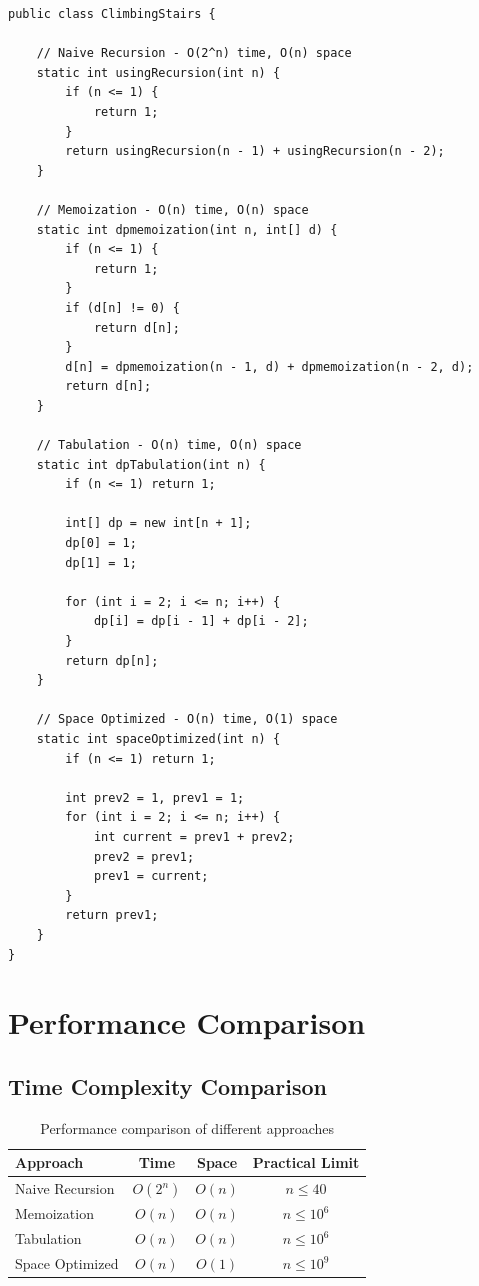 \documentclass[12pt,a4paper]{article}
\begin{document}
\begin{lstlisting}[caption=Complete Java Implementation]
public class ClimbingStairs {
    
    // Naive Recursion - O(2^n) time, O(n) space
    static int usingRecursion(int n) {
        if (n <= 1) {
            return 1;
        }
        return usingRecursion(n - 1) + usingRecursion(n - 2);
    }
    
    // Memoization - O(n) time, O(n) space
    static int dpmemoization(int n, int[] d) {
        if (n <= 1) {
            return 1;
        }
        if (d[n] != 0) {
            return d[n];
        }
        d[n] = dpmemoization(n - 1, d) + dpmemoization(n - 2, d);
        return d[n];
    }
    
    // Tabulation - O(n) time, O(n) space
    static int dpTabulation(int n) {
        if (n <= 1) return 1;
        
        int[] dp = new int[n + 1];
        dp[0] = 1;
        dp[1] = 1;
        
        for (int i = 2; i <= n; i++) {
            dp[i] = dp[i - 1] + dp[i - 2];
        }
        return dp[n];
    }
    
    // Space Optimized - O(n) time, O(1) space
    static int spaceOptimized(int n) {
        if (n <= 1) return 1;
        
        int prev2 = 1, prev1 = 1;
        for (int i = 2; i <= n; i++) {
            int current = prev1 + prev2;
            prev2 = prev1;
            prev1 = current;
        }
        return prev1;
    }
}
\end{lstlisting}

\section{Performance Comparison}

\subsection{Time Complexity Comparison}

\begin{table}[h]
\centering
\begin{tabular}{|l|c|c|c|}
\hline
\textbf{Approach} & \textbf{Time} & \textbf{Space} & \textbf{Practical Limit} \\
\hline
Naive Recursion & $O(2^n)$ & $O(n)$ & $n \leq 40$ \\
Memoization & $O(n)$ & $O(n)$ & $n \leq 10^6$ \\
Tabulation & $O(n)$ & $O(n)$ & $n \leq 10^6$ \\
Space Optimized & $O(n)$ & $O(1)$ & $n \leq 10^9$ \\
\hline
\end{tabular}
\caption{Performance comparison of different approaches}
\end{table}
\end{document}
